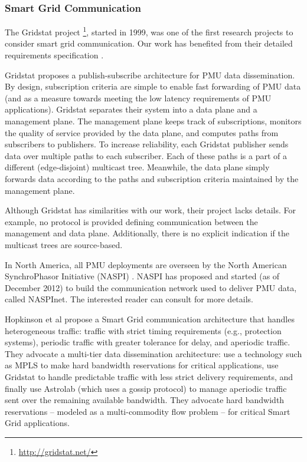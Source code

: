 \subsubsection{Smart Grid Communication}


The Gridstat project \footnote{\url{http://gridstat.net/}}, started in 1999, was one of the first research projects to consider smart grid communication.  
Our work has benefited from their %
detailed requirements specification \cite{Bakken11}.

Gridstat proposes a publish-subscribe architecture for PMU data dissemination. By design, subscription criteria are simple to enable fast forwarding of PMU data
(and as a measure towards meeting the low latency requirements of PMU applications).  
Gridstat separates their system into a data plane and a management plane. The management plane keeps track of subscriptions,
monitors the quality of service provided by the data plane, and computes paths from subscribers to publishers.  To increase reliability, each Gridstat publisher sends data over multiple paths
to each subscriber. Each of these paths is a part of a different (edge-disjoint) multicast tree.  Meanwhile, the data plane simply forwards data according to the paths and subscription 
criteria maintained by the management plane.  

Although Gridstat has similarities with our work, their project lacks details.  For example, no protocol is provided defining communication between the management and data plane. 
Additionally, there is no explicit indication if the multicast trees are source-based.

In North America, all PMU deployments are overseen by the North American SynchroPhasor Initiative (NASPI) \cite{Naspi10}.  NASPI has proposed and started (as of December 2012) to build the
communication network used to deliver PMU data, called NASPInet. The interested reader can consult \cite{Naspi10} for more details.


Hopkinson et al \cite{Hopkinson09} propose a Smart Grid communication architecture that handles heterogeneous traffic: traffic with strict timing requirements (e.g., protection systems), 
periodic traffic with greater tolerance for delay, and aperiodic traffic. They advocate a multi-tier data dissemination architecture: use a technology such as MPLS to make hard
bandwidth reservations for critical applications, use Gridstat to handle predictable traffic with less strict delivery requirements, and finally use Astrolab (which uses a gossip protocol) 
to manage aperiodic traffic sent over the remaining available bandwidth. They advocate hard bandwidth reservations -- modeled as a multi-commodity flow problem -- for critical Smart
Grid applications.




